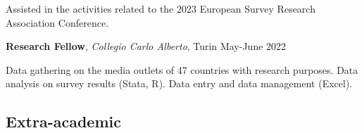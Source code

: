 \documentclass[10pt,]{article}
\providecommand{\tightlist}{%
  \setlength{\itemsep}{0pt}\setlength{\parskip}{0pt}}
\renewenvironment{itemize}{
  \begin{list}{}{
    \setlength{\leftmargin}{1.5em}
  }
}{
  \end{list}
}
\begin{document}
\begin{itemize}
  \begin{itemize}
  \tightlist
  \item
    Assisted in the activities related to the 2023 European Survey
    Research Association Conference.
  \end{itemize}
\item
  \textbf{Research Fellow}, \emph{Collegio Carlo Alberto}, Turin
  \hfill May-June 2022

  \begin{itemize}
  \tightlist
  \item
    Data gathering on the media outlets of 47 countries with research
    purposes. Data analysis on survey results (Stata, R). Data entry and
    data management (Excel).
  \end{itemize}
\end{itemize}

\subsection{Extra-academic}\label{extra-academic}
\end{document}
